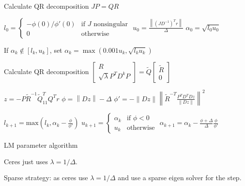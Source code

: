\begin{algorithm}
  \DontPrintSemicolon

  Calculate QR decomposition $J P = Q R$\;

  $l_{0} = \begin{cases} -\phi(0)/\phi'(0) & \text{if $J$ nonsingular} \\ 0 & \textrm{otherwise} \end{cases}$\;
  $u_{0} = \frac{\left\| (J D^{-1})^{T} r\right\|}{\Delta}$\;
  $\alpha_{0} = \sqrt{l_{0} u_{0}}$\;

  \Repeat{$|\phi| \leq 0.1 \Delta$} {
  If $\alpha_{k} \not \in [l_{k}, u_{k}]$, set $\alpha_{k} = \max\left(0.001 u_{k}, \sqrt{l_{k} u_{k}}\right)$\;

  Calculate QR decomposition $\begin{bmatrix} R \\ \sqrt{\lambda} P^{T} D^{k} P \end{bmatrix} = \tilde Q \begin{bmatrix} \tilde R \\ 0 \end{bmatrix}$\;

  $z = -P \tilde R^{-1} \tilde Q_{11}^{T} Q^{T} r$\;
  $\phi = \left\| D z \right\| - \Delta$\;
  $\phi' = - \| D z \| \left\| \tilde R^{-T} \frac{P^{T} D^{T} D z }{\| D z \|} \right\|^{2}$\;

  $l_{k+1} = \textrm{max}\left(l_{k}, \alpha_{k} - \frac{\phi}{\phi'}\right)$\;
  $u_{k+1} = \begin{cases} \alpha_{k} & \text{if $\phi < 0$} \\ u_{k} & \text{otherwise} \end{cases}$\;
  $\alpha_{k+1} = \alpha_{k} - \frac{\phi + \Delta}{\Delta} \frac{\phi}{\phi'}$\;
  }

  \caption{LM parameter algorithm}
  \label{algo:lm_parameter}
\end{algorithm}

\begin{remark}
  Ceres just uses $\lambda = 1 / \Delta$.

  Sparse strategy: as ceres use $\lambda = 1 / \Delta$ and use a sparse eigen solver for the step.
\end{remark}


